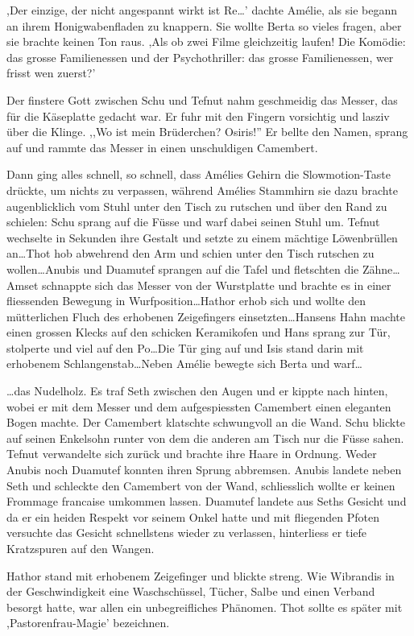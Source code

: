 \documentclass[11pt,titlepage,a5paper]{book}
\begin{document}
,Der einzige, der nicht angespannt wirkt ist Re\dots' dachte Amélie, als sie begann an ihrem Honigwabenfladen zu knappern. Sie wollte Berta so vieles fragen, aber sie brachte keinen Ton raus. ,Als ob zwei Filme gleichzeitig laufen! Die Komödie: das grosse Familienessen und der Psychothriller: das grosse Familienessen, wer frisst wen zuerst?'

Der finstere Gott zwischen Schu und Tefnut nahm geschmeidig das Messer, das für die Käseplatte gedacht war. Er fuhr mit den Fingern vorsichtig und lasziv über die Klinge. ,,Wo ist mein Brüderchen? Osiris!'' Er bellte den Namen, sprang auf und rammte das Messer in einen unschuldigen Camembert.

Dann ging alles schnell, so schnell, dass Amélies Gehirn die Slowmotion-Taste drückte, um nichts zu verpassen, während Amélies Stammhirn sie dazu brachte augenblicklich vom Stuhl unter den Tisch zu rutschen und über den Rand zu schielen: Schu sprang auf die Füsse und warf dabei seinen Stuhl um. Tefnut wechselte in Sekunden ihre Gestalt und setzte zu einem mächtige Löwenbrüllen an\dots Thot hob abwehrend den Arm und schien unter den Tisch rutschen zu wollen\dots Anubis und Duamutef sprangen auf die Tafel und fletschten die Zähne\dots Amset schnappte sich das Messer von der Wurstplatte und brachte es in einer fliessenden Bewegung in Wurfposition\dots Hathor erhob sich und wollte den mütterlichen Fluch des erhobenen Zeigefingers einsetzten\dots Hansens Hahn machte einen grossen Klecks auf den schicken Keramikofen und Hans sprang zur Tür, stolperte und viel auf den Po\dots Die Tür ging auf und Isis stand darin mit erhobenem Schlangenstab\dots Neben Amélie bewegte sich Berta und warf\dots

\dots das Nudelholz. Es traf Seth zwischen den Augen und er kippte nach hinten, wobei er mit dem Messer und dem aufgespiessten Camembert einen eleganten Bogen machte. Der Camembert klatschte schwungvoll an die Wand. Schu blickte auf seinen Enkelsohn runter von dem die anderen am Tisch nur die Füsse sahen. Tefnut verwandelte sich zurück und brachte ihre Haare in Ordnung. Weder Anubis noch Duamutef konnten ihren Sprung abbremsen. Anubis landete neben Seth und schleckte den Camembert von der Wand, schliesslich wollte er keinen Frommage francaise umkommen lassen. Duamutef landete aus Seths Gesicht und da er ein heiden Respekt vor seinem Onkel hatte und mit fliegenden Pfoten versuchte das Gesicht schnellstens wieder zu verlassen, hinterliess er tiefe Kratzspuren auf den Wangen.

Hathor stand mit erhobenem Zeigefinger und blickte streng. Wie Wibrandis in der Geschwindigkeit eine Waschschüssel, Tücher, Salbe und einen Verband besorgt hatte, war allen ein unbegreifliches Phänomen. Thot sollte es später mit ,Pastorenfrau-Magie' bezeichnen.
\end{document}

